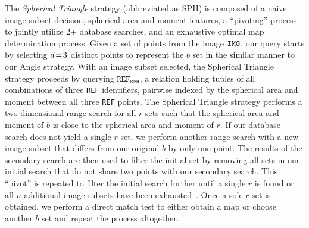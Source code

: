 
The \textit{Spherical Triangle} strategy (abbreviated as SPH) is composed of a naive image subset decision, spherical area and moment features, a ``pivoting'' process to jointly utilize 2+ database searches, and an exhaustive optimal map determination process.
Given a set of points from the image $\texttt{IMG}$, our query starts by selecting $d\!=\! 3$ distinct points to represent the $b$ set in the similar manner to our Angle strategy.
With an image subset selected, the Spherical Triangle strategy proceeds by querying $\texttt{REF}_\texttt{SPH}$, a relation holding tuples of all combinations of three \texttt{REF} identifiers, pairwise indexed by the spherical area and moment between all three \texttt{REF} points.
The Spherical Triangle strategy performs a two-dimensional range search for all $r$ sets such that the spherical area and moment of $b$ is close to the spherical area and moment of $r$.
If our database search does not yield a single $r$ set, we perform another range search with a new image subset that differs from our original $b$ by only one point.
The results of the secondary search are then used to filter the initial set by removing all sets in our initial search that do not share two points with our secondary search.
This ``pivot'' is repeated to filter the initial search further until a single $r$ is found or all $n$ additional image subsets have been exhausted~\cite{coleAndCrassidis:sphericalTriangleMethod}.
Once a sole $r$ set is obtained, we perform a direct match test to either obtain a map or choose another $b$ set and repeat the process altogether.

